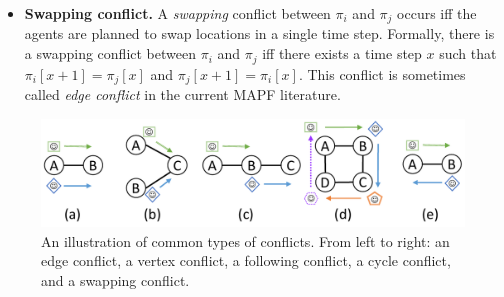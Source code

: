 \documentclass[letterpaper]{article} %
\newcommand{\mapf}{\ac{MAPF}\xspace}
\newcommand{\comment}[1]{{\nb{\textbf{Comment:}}{orange}{#1}}}
\begin{document}
\begin{itemize}
\item \textbf{Swapping conflict.} A \emph{swapping} conflict between $\pi_i$ and $\pi_j$ occurs iff
the agents are planned to swap locations in a single time step.
Formally, there is a swapping conflict between $\pi_i$ and $\pi_j$ iff there exists a time step $x$ such that
$\pi_i[x+1]=\pi_j[x]$ and $\pi_j[x+1]=\pi_i[x]$. This conflict is sometimes called \emph{edge conflict} in the current \mapf literature.

\end{itemize}

\begin{figure}
    \centering
    \includegraphics[width=\columnwidth]{types-of-conflicts.pdf}
    \caption{An illustration of common types of conflicts. From left to right: an edge conflict, a vertex conflict, a following conflict, a cycle conflict, and a swapping conflict.}
    \label{fig:types-of-conflicts}
\end{figure}
\end{document}
